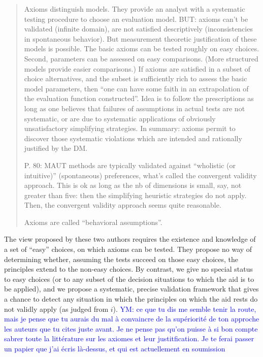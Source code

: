 \documentclass[preprint, french, english, 11pt, authoryear]{elsarticle}%
\newcommand{\commentYM}[1]{\textcolor{blue}{YM: #1}}
\begin{document}
\begin{quote}
Axioms distinguish models. They provide an analyst with a systematic testing procedure to choose an evaluation model. BUT: axioms can’t be validated (infinite domain), are not satisfied descriptively (inconsistencies in spontaneous behavior). But measurement theoretic justification of these models is possible. The basic axioms can be tested roughly on easy choices. Second, parameters can be assessed on easy comparisons. (More structured models provide easier comparisons.) If axioms are satisfied in a subset of choice alternatives, and the subset is sufficiently rich to assess the basic model parameters, then “one can have some faith in an extrapolation of the evaluation function constructed”. Idea is to follow the prescriptions as long as one believes that failures of assumptions in actual tests are not systematic, or are due to systematic applications of obviously unsatisfactory simplifying strategies. In summary: axioms permit to discover those systematic violations which are intended and rationally justified by the DM. 

P. 80: MAUT methods are typically validated against “wholistic (or intuitive)” (spontaneous) preferences, what’s called the convergent validity approach. This is ok as long as the nb of dimensions is small, say, not greater than five: then the simplifying heuristic strategies do not apply. Then, the convergent validity approach seems quite reasonable.

Axioms are called “behavioral assumptions”.
\end{quote}

The view proposed by these two authors requires the existence and knowledge of a set of “easy” choices, on which axioms can be tested. They propose no way of determining whether, assuming the tests succeed on those easy choices, the principles extend to the non-easy choices. By contrast, we give no special status to easy choices (or to any subset of the decision situations to which the aid is to be applied), and we propose a systematic, precise validation framework that gives a chance to detect any situation in which the principles on which the aid rests do not validly apply (as judged from $i$).
\commentYM{ce que tu dis me semble tenir la route, mais je pense que tu aurais du mal à convaincre de la supériorité de ton approche les auteurs que tu cites juste avant. Je ne pense pas qu'on puisse à si bon compte sabrer toute la littérature sur les axiomes et leur justitfication. Je te ferai passer un papier que j'ai écris là-dessus, et qui est actuellement en soumission}
\end{document}
